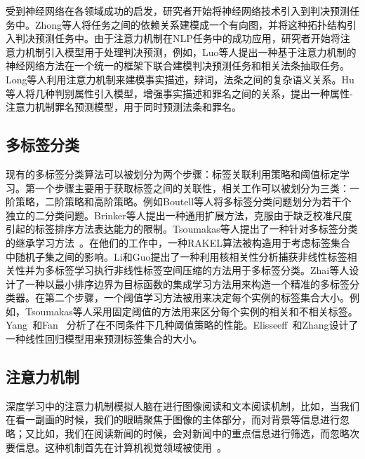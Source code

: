 受到神经网络在各领域成功的启发\cite{Kim14, BordesGWB12, LuongSLVZ15}，研究者开始将神经网络技术引入到判决预测任务中。Zhong等人将任务之间的依赖关系建模成一个有向图，并将这种拓扑结构引入判决预测任务中\cite{ZhongGTX0S18}。由于注意力机制在NLP任务中的成功应用，研究者开始将注意力机制引入模型用于处理判决预测，例如，Luo等人提出一种基于注意力机制的神经网络方法在一个统一的框架下联合建模判决预测任务和相关法条抽取任务\cite{luo2017learning}。Long等人利用注意力机制来建模事实描述，辩词，法条之间的复杂语义关系\cite{abs-1809-06537}。Hu等人将几种判别属性引入模型，增强事实描述和罪名之间的关系，提出一种属性-注意力机制罪名预测模型，用于同时预测法条和罪名\cite{C18-1041}。

\subsection{多标签分类}
现有的多标签分类算法可以被划分为两个步骤：标签关联利用策略和阈值标定学习。第一个步骤主要用于获取标签之间的关联性，相关工作可以被划分为三类\cite{Zhang2014A}：一阶策略，二阶策略和高阶策略。例如Boutell等人将多标签分类问题划分为若干个独立的二分类问题\cite{Boutell2004Learning}。Brinker等人提出一种通用扩展方法，克服由于缺乏校准尺度引起的标签排序方法表达能力的限制\cite{Brinker2008Multilabel}。Tsoumakas等人提出了一种针对多标签分类的继承学习方法~\cite{Tsoumakas2007Random}。在他们的工作中，一种RAKEL算法被构造用于考虑标签集合中随机子集之间的影响。Li和Guo提出了一种利用核相关性分析捕获非线性标签相关性并为多标签学习执行非线性标签空间压缩的方法用于多标签分类\cite{Li2015Multi}。Zhai等人设计了一种以最小排序边界为目标函数的集成学习方法用来构造一个精准的多标签分类器\cite{Zhai2015A}。在第二个步骤，一个阈值学习方法被用来决定每个实例的标签集合大小。例如，Tsoumakas等人采用固定阈值的方法用来区分每个实例的相关和不相关标签\cite{Tsoumakas2007Random}。Yang~\cite{Yang2001}和Fan~\cite{fan2007study} 分析了在不同条件下几种阈值策略的性能。Elisseeff~\cite{Elisseeff2001A}和Zhang\cite{Zhang2014A}设计了一种线性回归模型用来预测标签集合的大小。

\subsection{注意力机制}
深度学习中的注意力机制模拟人脑在进行图像阅读和文本阅读机制，比如，当我们在看一副画的时候，我们的眼睛聚焦于图像的主体部分，而对背景等信息进行忽略；又比如，我们在阅读新闻的时候，会对新闻中的重点信息进行筛选，而忽略次要信息。这种机制首先在计算机视觉领域被使用~\cite{MnihHGK14}。

